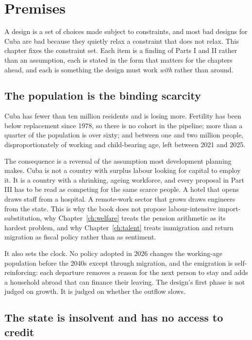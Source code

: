 \chapter{Premises}
\label{ch:premises}

A design is a set of choices made subject to constraints, and most bad designs
for Cuba are bad because they quietly relax a constraint that does not relax.
This chapter fixes the constraint set. Each item is a finding of Parts I and II
rather than an assumption, each is stated in the form that matters for the
chapters ahead, and each is something the design must work \emph{with} rather
than around.

\section{The population is the binding scarcity}

Cuba has fewer than ten million residents and is losing more. Fertility has been
below replacement since 1978, so there is no cohort in the pipeline; more than a
quarter of the population is over sixty; and between one and two million people,
disproportionately of working and child-bearing age, left between 2021 and 2025.

The consequence is a reversal of the assumption most development planning makes.
Cuba is not a country with surplus labour looking for capital to employ it. It is
a country with a shrinking, ageing workforce, and every proposal in Part III has
to be read as competing for the same scarce people. A hotel that opens draws
staff from a hospital. A remote-work sector that grows draws engineers from the
state. This is why the book does not propose labour-intensive
import-substitution, why Chapter~\ref{ch:welfare} treats the pension arithmetic
as its hardest problem, and why Chapter~\ref{ch:talent} treats immigration and
return migration as fiscal policy rather than as sentiment.

It also sets the clock. No policy adopted in 2026 changes the working-age
population before the 2040s except through migration, and the emigration is
self-reinforcing: each departure removes a reason for the next person to stay
and adds a household abroad that can finance their leaving. The design's first
phase is not judged on growth. It is judged on whether the outflow slows.

\section{The state is insolvent and has no access to credit}

